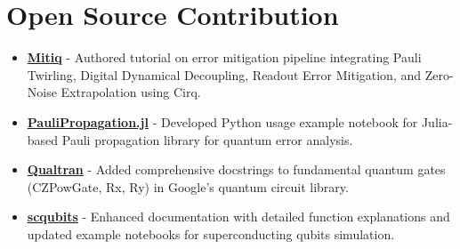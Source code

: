 \documentclass[11pt,a3paper]{moderncv}
\begin{document}
\begin{minipage}[t]{0.62\textwidth}
\section{Open Source Contribution}
{\small
\newcommand{\opensource}[3]{
    \item \href{#2}{\textbf{#1}} - #3
}
\begin{itemize}
    \opensource
        {Mitiq}
        {https://github.com/unitaryfund/mitiq}
        {Authored tutorial on error mitigation pipeline integrating Pauli Twirling, Digital Dynamical Decoupling, Readout Error Mitigation, and Zero-Noise Extrapolation using Cirq.}
    \opensource
        {PauliPropagation.jl}
        {https://github.com/MSRudolph/PauliPropagation.jl}
        {Developed Python usage example notebook for Julia-based Pauli propagation library for quantum error analysis.}
    \opensource
        {Qualtran}
        {https://github.com/quantumlib/Qualtran}
        {Added comprehensive docstrings to fundamental quantum gates (CZPowGate, Rx, Ry) in Google's quantum circuit library.}
    \opensource
        {scqubits}
        {https://github.com/scqubits/scqubits}
        {Enhanced documentation with detailed function explanations and updated example notebooks for superconducting qubits simulation.}
\end{itemize}
}
\end{minipage}
\hfill
\end{document}
